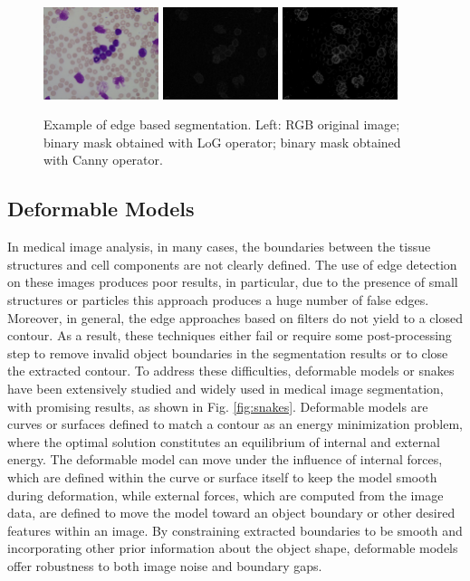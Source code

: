 \documentclass[final,a4paper,12pt,english]{UnicaPhdThesis3}
\begin{document}
\begin{figure}[h]
	\centering
	\includegraphics[width=0.3\textwidth]{images/figcs_rgb}
	\includegraphics[width=0.3\textwidth]{images/fig_OpLog}
	\includegraphics[width=0.3\textwidth]{images/fig_OpCanny}
	\caption{\label{fig:edge}Example of edge based segmentation. Left: RGB original image; binary mask obtained with LoG operator; binary mask obtained with Canny operator.}
\end{figure}

\subsection{Deformable Models} 
In medical image analysis, in many cases, the boundaries between the tissue structures and cell components are not clearly defined. The use of edge detection on these images produces poor results, in particular, due to the presence of small structures or particles this approach produces a huge number of false edges. Moreover, in general, the edge approaches based on filters do not yield to a closed contour. As a result, these techniques either fail or require some post-processing step to remove invalid object boundaries in the segmentation results or to close the extracted contour. To address these difficulties, deformable models or snakes \cite{Kass} have been extensively studied and widely used in medical image segmentation, with promising results, as shown in Fig. \ref{fig:snakes}. Deformable models are curves or surfaces defined to match a contour as an energy minimization problem, where the optimal solution constitutes an equilibrium of internal and external energy. The deformable model can move under the influence of internal forces, which are defined within the curve or surface itself to keep the model smooth during deformation, while external forces, which are computed from the image data, are defined to move the model toward an object boundary or other desired features within an image. By constraining extracted boundaries to be smooth and incorporating other prior information about the object shape, deformable models offer robustness to both image noise and boundary gaps.
\end{document}
